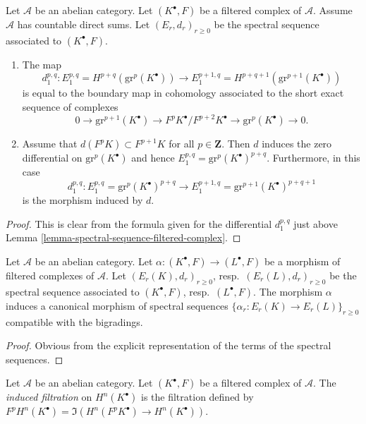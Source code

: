 \begin{lemma}
\label{lemma-spectral-sequence-filtered-complex-d1}
Let $\mathcal{A}$ be an abelian category.
Let $(K^\bullet, F)$ be a filtered complex of $\mathcal{A}$.
Assume $\mathcal{A}$ has countable direct sums.
Let $(E_r, d_r)_{r \geq 0}$ be the spectral sequence
associated to $(K^\bullet, F)$.
\begin{enumerate}
\item The map
$$
d_1^{p, q} :
E_1^{p, q} = H^{p + q}(\text{gr}^p(K^\bullet))
\longrightarrow
E_1^{p + 1, q} = H^{p + q + 1}(\text{gr}^{p + 1}(K^\bullet))
$$
is equal to the boundary map in cohomology associated to the short
exact sequence of complexes
$$
0 \to \text{gr}^{p + 1}(K^\bullet) \to
F^pK^\bullet/F^{p + 2}K^\bullet \to \text{gr}^p(K^\bullet) \to 0.
$$
\item Assume that $d(F^pK) \subset F^{p + 1}K$ for all $p \in \mathbf{Z}$.
Then $d$ induces the zero differential on $\text{gr}^p(K^\bullet)$
and hence
$E_1^{p, q} = \text{gr}^p(K^\bullet)^{p + q}$.
Furthermore, in this case
$$
d_1^{p, q} :
E_1^{p, q} = \text{gr}^p(K^\bullet)^{p + q}
\longrightarrow
E_1^{p + 1, q} = \text{gr}^{p + 1}(K^\bullet)^{p + q + 1}
$$
is the morphism induced by $d$.
\end{enumerate}
\end{lemma}

\begin{proof}
This is clear from the formula given for the differential
$d_1^{p, q}$ just above Lemma \ref{lemma-spectral-sequence-filtered-complex}.
\end{proof}

\begin{lemma}
\label{lemma-spectral-sequence-filtered-complex-functorial}
Let $\mathcal{A}$ be an abelian category.
Let $\alpha : (K^\bullet, F) \to (L^\bullet, F)$ be a morphism of
filtered complexes of $\mathcal{A}$. Let $(E_r(K), d_r)_{r \geq 0}$,
resp.\ $(E_r(L), d_r)_{r \geq 0}$ be the spectral sequence associated
to $(K^\bullet, F)$, resp.\ $(L^\bullet, F)$.
The morphism $\alpha$ induces a canonical morphism of spectral
sequences $\{\alpha_r : E_r(K) \to E_r(L)\}_{r \geq 0}$ compatible
with the bigradings.
\end{lemma}

\begin{proof}
Obvious from the explicit representation of the terms of the
spectral sequences.
\end{proof}

\begin{definition}
\label{definition-filtration-cohomology-filtered-complex}
Let $\mathcal{A}$ be an abelian category.
Let $(K^\bullet, F)$ be a filtered complex of $\mathcal{A}$.
The {\it induced filtration} on $H^n(K^\bullet)$ is the filtration defined
by $F^pH^n(K^\bullet) = \Im(H^n(F^pK^\bullet) \to H^n(K^\bullet))$.
\end{definition}

